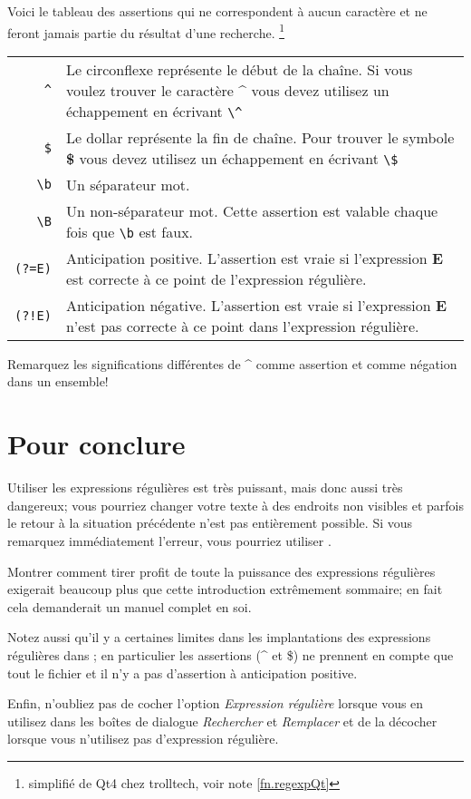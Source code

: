 Voici le tableau des \og assertions\fg{} qui ne correspondent à aucun caractère et ne feront jamais partie du résultat d'une recherche. \footnote{simplifié de Qt4 chez trolltech, voir note \ref{fn.regexpQt}}
\smallskip

\noindent\begin{tabular}{Rp{113mm}}
\toprule
\verb|^| & Le circonflexe représente le début de la chaîne. Si vous voulez trouver le caractère \textbf{\^{}} vous devez utilisez un échappement en écrivant \verb|\^|\\
\verb|$| & Le dollar représente la fin de chaîne. Pour trouver le symbole \textbf{\$} vous devez utilisez un échappement en écrivant \verb|\$|\\  
\verb|\b| & Un séparateur mot.\\
\verb|\B| & Un non-séparateur mot. Cette assertion est valable chaque fois que \verb|\b| est faux.\\
\verb|(?=E)| & Anticipation positive. L'assertion est vraie si l'expression \textbf{E} est correcte à ce point de l'expression régulière.\\
\verb|(?!E)| & Anticipation négative. L'assertion est vraie si l'expression \textbf{E} n'est pas correcte à ce point dans l'expression régulière.\\
\bottomrule
\end{tabular}
\smallskip

Remarquez les significations différentes de \textbf{\^{}} comme assertion et comme négation dans un ensemble!

\section{Pour conclure}

Utiliser les expressions régulières est très puissant, mais donc aussi très dangereux; vous pourriez changer votre texte à des endroits non visibles et parfois le retour à la situation précédente n'est pas entièrement possible. Si vous remarquez immédiatement l'erreur, vous pourriez utiliser \mbox{}.

Montrer comment tirer profit de toute la puissance des expressions régulières exigerait beaucoup plus que cette introduction extrêmement sommaire; en fait cela demanderait un manuel complet en soi.

Notez aussi qu'il y a certaines limites dans les implantations des expressions régulières dans \Tw; en particulier les assertions (\^{} et \$) ne prennent en compte que tout le fichier et il n'y a pas d'assertion à anticipation positive.

Enfin, n'oubliez pas de \og cocher\fg{} l'option \textsl{Expression régulière} lorsque vous en utilisez dans les boîtes de dialogue \emph{Rechercher} et \emph{Remplacer} et de la décocher lorsque vous n'utilisez pas d'expression régulière.
